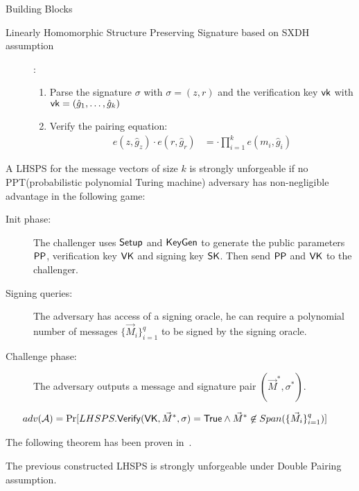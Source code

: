 \begin{subsection}{Building Blocks}
\begin{myDef}{Linearly Homomorphic Structure Preserving Signature based on SXDH assumption~\cite{DBLP:conf/crypto/LibertPJY13}}
\begin{description}
    \item[]:
      \begin{enumerate}
      \item Parse the signature $\sigma$ with $\sigma = (z, r)$ and the verification key $\mathsf{vk}$ with $\mathsf{vk} = (\hat{g}_1, \dots, \hat{g}_k)$
      \item Verify the pairing equation:
        \begin{align*}
          e(z, \hat{g}_z) \cdot e(r, \hat{g}_r) &=  \cdot \prod_{i = 1}^ke(m_i, \hat{g}_i)
        \end{align*}
      \end{enumerate}
    \end{description}
  \end{myDef}


  \begin{myDef} A LHSPS for the message vectors of size $k$ is strongly unforgeable if no PPT(probabilistic polynomial Turing machine) adversary has non-negligible advantage in the following game:
    \begin{description}
    \item[Init phase: ]The challenger uses ${\mathsf{Setup}}$ and ${\mathsf{KeyGen}}$ to generate the public parameters $\mathsf{PP}$, verification key $\mathsf{VK}$ and signing key $\mathsf{SK}$. Then send $\mathsf{PP}$ and $\mathsf{VK}$ to the challenger.
    \item[Signing queries: ] The adversary has access of a signing oracle, he can require a polynomial number of messages $\{\vec{M}_i\}_{i = 1}^q$ to be signed by the signing oracle. 
    \item[Challenge phase: ] The adversary outputs a message and signature pair $(\vec{M}^*, \sigma^*)$.
    \end{description}

    \begin{align*}
      adv(\mathcal{A}) &= \operatorname{Pr}[LHSPS.{\mathsf{Verify}}(\mathsf{VK}, \vec{M}^* , \sigma) = \mathsf{True} \wedge \vec{M}^* \not \in Span(\{\vec{M}_i\}_{i=1}^q)]
    \end{align*}

  \end{myDef}

  The following theorem has been proven in~\cite{DBLP:journals/dcc/LibertPJY15}.
  
  \begin{myTh}
    The previous constructed LHSPS is strongly unforgeable under Double Pairing assumption.
  \end{myTh}
  

\end{subsection}
